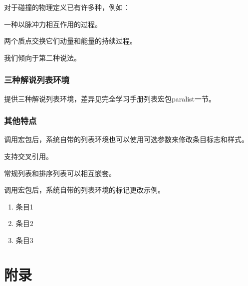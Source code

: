\begin{codeshow}
	对于碰撞的物理定义已有许多种，例如：
	\begin{compactenum}[{定义} \itshape (1)]
		\item 一种以脉冲力相互作用的过程。
		\item 两个质点交换它们动量和能量的持续过程。
	\end{compactenum}
	我们倾向于第二种说法。
\end{codeshow}

\subsubsection{三种解说列表环境}
提供三种解说列表环境，差异见\LaTeXe 完全学习手册列表宏包paralist一节。

\subsubsection{其他特点}
\begin{asparaenum}[(1)]
	\item 调用宏包后，系统自带的列表环境也可以使用可选参数来修改条目标志和样式。
	\item 支持交叉引用。
	\item 常规列表和排序列表可以相互嵌套。
\end{asparaenum}

\begin{codeshow}
	调用宏包后，系统自带的列表环境的标记更改示例。
	\begin{enumerate}[(1)]
		\itemsep=0pt
		\parskip=0pt
		\item 条目1
		\item 条目2
		\item 条目3
		\end{enumerate}
\end{codeshow}

\section{附录}